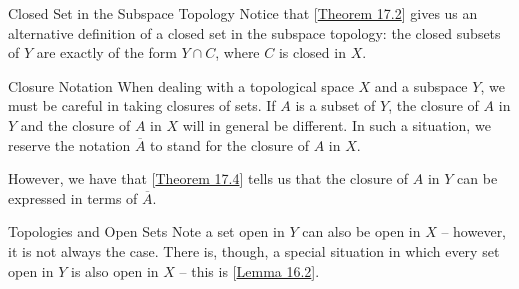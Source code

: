 \begin{remarkBox}{Closed Set in the Subspace Topology}
    Notice that [\hyperlink{thm:17.2}{Theorem 17.2}] gives us an alternative 
    definition of
    a closed set in the subspace topology: the closed subsets of 
    \( Y \) are exactly of the form \( Y \cap C \), where \( C \) is closed 
    in \( X \).
\end{remarkBox}

\begin{remarkBox}{Closure Notation}
    When dealing with a topological space \( X \) and a subspace \( Y \), we
    must be careful in taking closures of sets.
    If \( A \) is a subset of \( Y \), the closure of \( A \) in \( Y \) and 
    the closure of \( A \) in \( X \) will in general be different.
    In such a situation, we reserve the notation \( \overline{ A } \) to stand
    for the closure of \( A \) in \( X \).

    \baseSkip

    However, we have that [\hyperlink{thm:17.4}{Theorem 17.4}] tells us that the
    closure of \( A \) in \( Y \) can be expressed in terms of 
    \( \overline{ A } \).
\end{remarkBox}

\begin{remarkBox}{Topologies and Open Sets}
    Note a set open in \( Y \) can also be open in \( X \)
    -- however, it is not always the case.
    There is, though, a special situation in which every set open in \( Y \)
    is also open in \( X \) -- this is [\hyperlink{lem:16.2}{Lemma 16.2}].
\end{remarkBox}